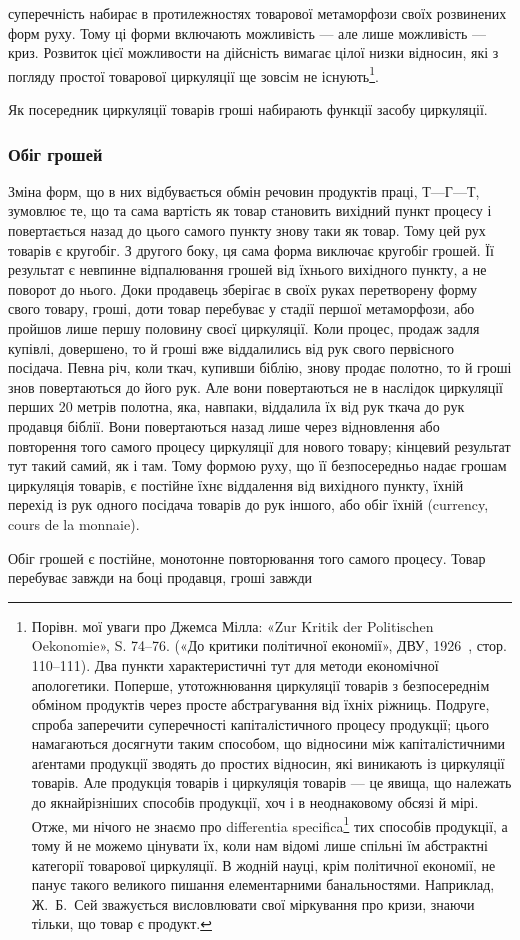 \parcont{}  %
суперечність набирає в протилежностях товарової метаморфози
своїх розвинених форм руху. Тому ці форми включають можливість
— але лише можливість — криз. Розвиток цієї можливости
на дійсність вимагає цілої низки відносин, які з погляду простої
товарової циркуляції ще зовсім не існують\footnote{
Порівн. мої уваги про Джемса Мілла: «Zur Kritik der Politischen
Oekonomie», S. 74--76. («До критики політичної економії», ДВУ, 1926~,
стор. 110--111). Два пункти характеристичні тут для методи економічної
апологетики. Поперше, утотожнювання циркуляції товарів з безпосереднім
обміном продуктів через просте абстрагування від їхніх ріжниць.
Подруге, спроба заперечити суперечності капіталістичного процесу продукції;
цього намагаються досягнути таким способом, що відносини між
капіталістичними аґентами продукції зводять до простих відносин, які
виникають із циркуляції товарів. Але продукція товарів і циркуляція
товарів — це явища, що належать до якнайрізніших способів продукції,
хоч і в неоднаковому обсязі й мірі. Отже, ми нічого не знаємо про differentia
specifica\footnote*{
характеристичні особливості. 
} тих способів продукції, а тому й не можемо цінувати їх,
коли нам відомі лише спільні їм абстрактні категорії товарової циркуляції.
В жодній науці, крім політичної економії, не панує такого великого
пишання елементарними банальностями. Наприклад, Ж.~Б.~Сей зважується
висловлювати свої міркування про кризи, знаючи тільки, що товар
є продукт.
}.

Як посередник циркуляції товарів гроші набирають функції
засобу циркуляції.

\subsubsection{Обіг грошей}

Зміна форм, що в них відбувається обмін речовин продуктів
праці, $Т — Г — Т$, зумовлює те, що та сама вартість як товар
становить вихідний пункт процесу і повертається назад до цього
самого пункту знову таки як товар. Тому цей рух товарів є кругобіг.
З другого боку, ця сама форма виключає кругобіг грошей.
Її результат є невпинне відпалювання грошей від їхнього вихідного
пункту, а не поворот до нього. Доки продавець зберігає
в своїх руках перетворену форму свого товару, гроші, доти
товар перебуває у стадії першої метаморфози, або пройшов лише
першу половину своєї циркуляції. Коли процес, продаж задля
купівлі, довершено, то й гроші вже віддалились від рук свого
первісного посідача. Певна річ, коли ткач, купивши біблію,
знову продає полотно, то й гроші знов повертаються до його рук.
Але вони повертаються не в наслідок циркуляції перших
20 метрів полотна, яка, навпаки, віддалила їх від рук ткача
до рук продавця біблії. Вони повертаються назад лише через
відновлення або повторення того самого процесу циркуляції
для нового товару; кінцевий результат тут такий самий, як
і там. Тому формою руху, що її безпосередньо надає грошам
циркуляція товарів, є постійне їхнє віддалення від вихідного
пункту, їхній перехід із рук одного посідача товарів до рук
іншого, або обіг їхній (currency, cours de la monnaie).

Обіг грошей є постійне, монотонне повторювання того самого
процесу. Товар перебуває завжди на боці продавця, гроші завжди
\parbreak{}  %
